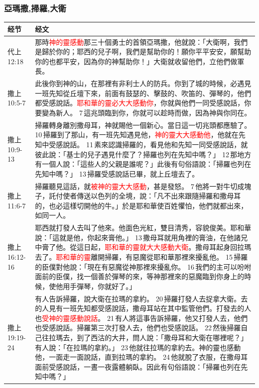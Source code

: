 \subsubsection{亞瑪撒,掃羅,大衛}
\begin{table}[H]
\centering
\begin{tabular}{p{6em}p{40em}}  \toprule
经节&经文 \\  \midrule
代上12:18&那時\textcolor{red}{神的靈感動}那三十個勇士的首領亞瑪撒，他就說：「大衛啊，我們是歸於你的；耶西的兒子啊，我們是幫助你的！願你平平安安，願幫助你的也都平安，因為你的神幫助你！」大衛就收留他們，立他們做軍長。 \\  \midrule

撒上10:5-7&此後你到神的山，在那裡有非利士人的防兵。你到了城的時候，必遇見一班先知從丘壇下來，前面有鼓瑟的、擊鼓的、吹笛的、彈琴的，他們都受感說話。\textcolor{red}{耶和華的靈必大大感動你}，你就與他們一同受感說話，你要變為新人。 7 這兆頭臨到你，你就可以趁時而做，因為神與你同在。\\  \midrule
撒上10:9-13&掃羅轉身離別撒母耳，神就賜他一個新心。當日這一切兆頭都應驗了。 10 掃羅到了那山，有一班先知遇見他，\textcolor{red}{神的靈大大感動他}，他就在先知中受感說話。 11 素來認識掃羅的，看見他和先知一同受感說話，就彼此說：「基士的兒子遇見什麼了？掃羅也列在先知中嗎？」 12 那地方有一個人說：「這些人的父親是誰呢？」此後有句俗語說：「掃羅也列在先知中嗎？」 13 掃羅受感說話已畢，就上丘壇去了。\\  \midrule

撒上11:6-7&掃羅聽見這話，就\textcolor{red}{被神的靈大大感動}，甚是發怒。 7 他將一對牛切成塊子，託付使者傳送以色列的全境，說：「凡不出來跟隨掃羅和撒母耳的，也必這樣切開他的牛。」於是耶和華使百姓懼怕，他們就都出來，如同一人。\\  \midrule
撒上16:12-16&耶西就打發人去叫了他來。他面色光紅，雙目清秀，容貌俊美。耶和華說：「這就是他，你起來膏他。」 13 撒母耳就用角裡的膏油，在他諸兄中膏了他。從這日起，\textcolor{red}{耶和華的靈就大大感動大衛}。撒母耳起身回拉瑪去了。\textcolor{red}{耶和華的靈}離開掃羅，有惡魔從耶和華那裡來擾亂他。 15 掃羅的臣僕對他說：「現在有惡魔從神那裡來擾亂你。 16 我們的主可以吩咐面前的臣僕，找一個善於彈琴的來，等神那裡來的惡魔臨到你身上的時候，使他用手彈琴，你就好了。」\\  \midrule

撒上19:19-24&有人告訴掃羅，說大衛在拉瑪的拿約。 20 掃羅打發人去捉拿大衛。去的人見有一班先知都受感說話，撒母耳站在其中監管他們。打發去的人也\textcolor{red}{受神的靈感動說話}。 21 有人將這事告訴掃羅，他又打發人去，他們也受感說話。掃羅第三次打發人去，他們也受感說話。 22 然後掃羅自己往拉瑪去，到了西沽的大井，問人說：「撒母耳和大衛在哪裡呢？」有人說：「在拉瑪的拿約。」 23 他就往拉瑪的拿約去。神的靈也感動他，一面走一面說話，直到拉瑪的拿約。 24 他就脫了衣服，在撒母耳面前受感說話，一晝一夜露體躺臥。因此有句俗語說：「掃羅也列在先知中嗎？」\\  \midrule


\end{tabular}
\end{table}
